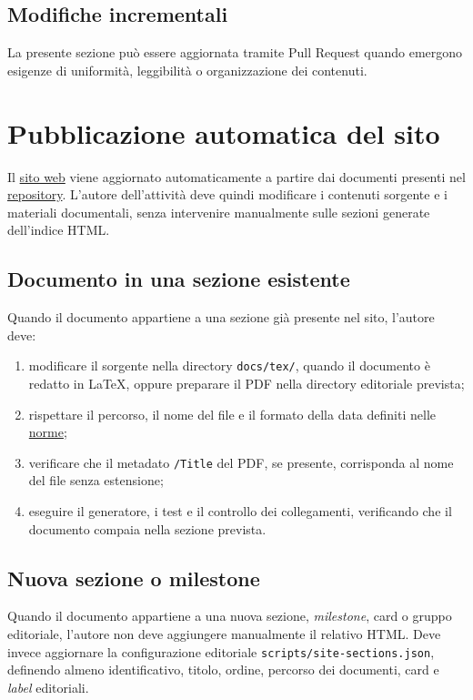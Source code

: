 \documentclass[11pt, a4paper]{article}
\begin{document}
\subsection{Modifiche incrementali}

La presente sezione può essere aggiornata tramite Pull Request quando emergono esigenze di uniformità, leggibilità o organizzazione dei contenuti.

\section{Pubblicazione automatica del sito}
\label{sec:pubblicazione-automatica}

Il \href{https://on-by-one-team.github.io/On-By-One.github.io/}{sito web} viene aggiornato automaticamente a partire dai documenti presenti nel \href{https://github.com/On-By-One-Team/On-By-One.github.io}{repository}. L'autore dell'attività deve quindi modificare i contenuti sorgente e i materiali documentali, senza intervenire manualmente sulle sezioni generate dell'indice HTML.

\subsection{Documento in una sezione esistente}

Quando il documento appartiene a una sezione già presente nel sito, l'autore deve:
\begin{enumerate}
    \item modificare il sorgente nella directory \texttt{docs/tex/}, quando il documento è redatto in LaTeX, oppure preparare il PDF nella directory editoriale prevista;
    \item rispettare il percorso, il nome del file e il formato della data definiti nelle \hyperref[sec:convenzioni-denominazione]{norme};
    \item verificare che il metadato \texttt{/Title} del PDF, se presente, corrisponda al nome del file senza estensione;
    \item eseguire il generatore, i test e il controllo dei collegamenti, verificando che il documento compaia nella sezione prevista.
\end{enumerate}

\subsection{Nuova sezione o milestone}

Quando il documento appartiene a una nuova sezione, \textit{milestone}, card o gruppo editoriale, l'autore non deve aggiungere manualmente il relativo HTML. Deve invece aggiornare la configurazione editoriale \texttt{scripts/site-sections.json}, definendo almeno identificativo, titolo, ordine, percorso dei documenti, card e \textit{label} editoriali.
\end{document}
